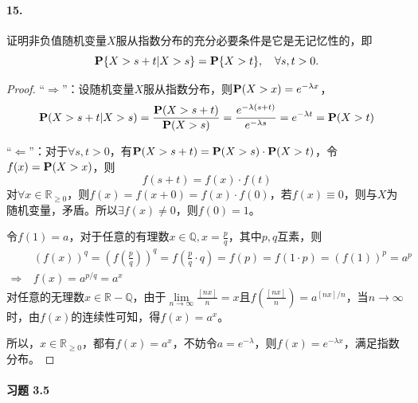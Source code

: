 \documentclass[12pt, a4paper, oneside]{ctexart}
\begin{document}
\paragraph{15.}证明非负值随机变量$X$服从指数分布的充分必要条件是它是无记忆性的，即\begin{equation*}
    \P\{X>s+t|X>s\}=\P\{X>t\},\quad\forall s,t > 0.
\end{equation*}

\begin{proof}
    “$\Rightarrow$”：设随机变量$X$服从指数分布，则$\P(X>x) = e^{-\lambda x}$，
    \begin{equation*}
        \P(X>s+t|X>s) = \frac{\P(X>s+t)}{\P(X>s)} = \frac{e^{-\lambda(s+t)}}{e^{-\lambda s}} = e^{-\lambda t} = \P(X > t)
    \end{equation*}
    
    “$\Leftarrow$”：对于$\forall s, t > 0$，有$\P(X>s+t) = \P(X>s)\cdot \P(X>t)$，令$f(x) = \P(X>x)$，则
    \begin{equation*}
        f(s+t) = f(x)\cdot f(t)
    \end{equation*}
    对$\forall x \in \mathbb{R}_{\geqslant 0}$，则$f(x)=f(x+0) = f(x)\cdot f(0)$，若$f(x)\equiv 0$，则与$X$为随机变量，矛盾。所以$\exists f(x)\neq 0$，则$f(0) = 1$。
    
    令$f(1) = a$，对于任意的有理数$x\in\mathbb{Q}, x=  \frac{p}{q}$，其中$p,q$互素，则
    \begin{equation*}
        \begin{aligned}
            &\ \left(f(x)\right)^q = \left(f(\frac{p}{q})\right)^q = f(\frac{p}{q}\cdot q) = f(p) = f(1\cdot p) = \left(f(1)\right)^p = a^p\\
            \Rightarrow&\ f(x) = a^{p/q} = a^x
        \end{aligned}
    \end{equation*}
    对任意的无理数$x\in\mathbb{R}-\mathbb{Q}$，由于$\lim\limits_{n\rightarrow \infty}\frac{[nx]}{n} = x$且$f\left(\frac{[nx]}{n}\right) = a^{[nx]/n}$，当$n\rightarrow\infty$时，由$f(x)$的连续性可知，得$f(x) = a^x$。

    所以，$x\in \mathbb{R}_{\geqslant 0}$，都有$f(x) = a^x$，不妨令$a = e^{-\lambda}$，则$f(x) = e^{-\lambda x}$，满足指数分布。

\end{proof}
\paragraph{习题 3.5}
\end{document}
